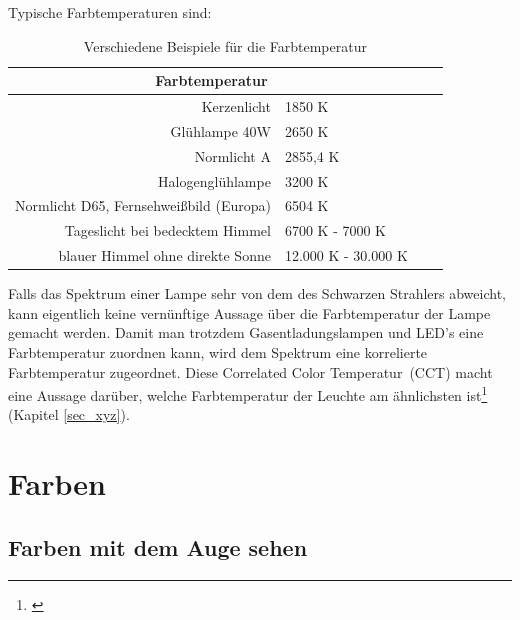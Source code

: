 Typische Farbtemperaturen sind:

\begin{table}[htp] 
		\centering
		\begin{tabular}{rlcc}  %
		\toprule
		\multicolumn{2}{c}{\large\sffamily Farbtemperatur}\\ 							
		\midrule
		Kerzenlicht & 1850 K\\
		Glühlampe 40W & 2650 K\\
		Normlicht A & 2855,4 K\\
		Halogenglühlampe & 3200 K\\
		Normlicht D65, Fernsehweißbild (Europa) & 6504 K\\
		Tageslicht bei bedecktem Himmel & 6700 K - 7000 K\\
		blauer Himmel ohne direkte Sonne & 12.000 K - 30.000 K\\
		\bottomrule
		\end{tabular}
		\caption{Verschiedene Beispiele für die Farbtemperatur\protect\footnotemark}	
		\label{t_cct}
	\end{table}


Falls das Spektrum einer Lampe sehr von dem des Schwarzen Strahlers abweicht, kann eigentlich keine vernünftige Aussage über die Farbtemperatur der Lampe gemacht werden. Damit man trotzdem Gasentladungslampen und LED's eine Farbtemperatur zuordnen kann, wird dem Spektrum eine korrelierte Farbtemperatur zugeordnet. Diese \glqq Correlated Color Temperatur\grqq\ (CCT) macht eine Aussage darüber, welche Farbtemperatur der Leuchte am ähnlichsten ist\footnote{\cite[91]{mueller}} (Kapitel \ref{sec_xyz}).

\chapter{Farben}


\section{Farben mit dem Auge sehen} \label{sec_auge}

